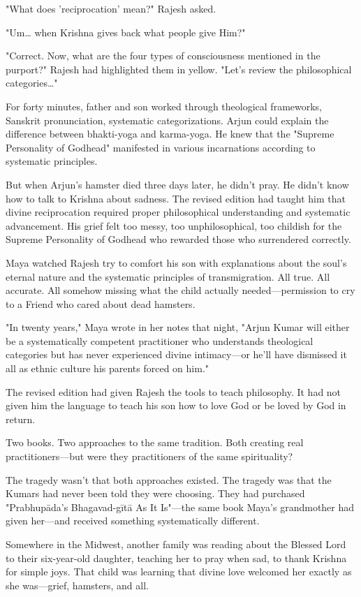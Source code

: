 \documentclass[12pt,twoside]{book}
\begin{document}
"What does 'reciprocation' mean?" Rajesh asked.

"Um\ldots{} when Krishna gives back what people give Him?"

"Correct. Now, what are the four types of consciousness mentioned in the purport?" Rajesh had highlighted them in yellow. "Let's review the philosophical categories\ldots{}"

For forty minutes, father and son worked through theological frameworks, Sanskrit pronunciation, systematic categorizations. Arjun could explain the difference between bhakti-yoga and karma-yoga. He knew that the "Supreme Personality of Godhead" manifested in various incarnations according to systematic principles.

But when Arjun's hamster died three days later, he didn't pray. He didn't know how to talk to Krishna about sadness. The revised edition had taught him that divine reciprocation required proper philosophical understanding and systematic advancement. His grief felt too messy, too unphilosophical, too childish for the Supreme Personality of Godhead who rewarded those who surrendered correctly.

Maya watched Rajesh try to comfort his son with explanations about the soul's eternal nature and the systematic principles of transmigration. All true. All accurate. All somehow missing what the child actually needed—permission to cry to a Friend who cared about dead hamsters.

"In twenty years," Maya wrote in her notes that night, "Arjun Kumar will either be a systematically competent practitioner who understands theological categories but has never experienced divine intimacy—or he'll have dismissed it all as ethnic culture his parents forced on him."

The revised edition had given Rajesh the tools to teach philosophy. It had not given him the language to teach his son how to love God or be loved by God in return.

Two books. Two approaches to the same tradition. Both creating real practitioners—but were they practitioners of the same spirituality?

The tragedy wasn't that both approaches existed. The tragedy was that the Kumars had never been told they were choosing. They had purchased "Prabhupāda's Bhagavad-gītā As It Is"—the same book Maya's grandmother had given her—and received something systematically different.

Somewhere in the Midwest, another family was reading about the Blessed Lord to their six-year-old daughter, teaching her to pray when sad, to thank Krishna for simple joys. That child was learning that divine love welcomed her exactly as she was—grief, hamsters, and all.
\end{document}
